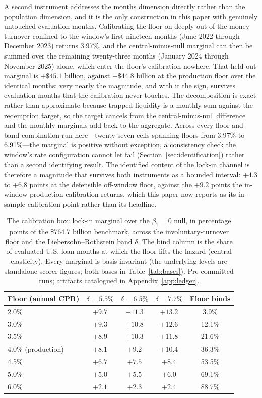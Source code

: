\documentclass[12pt]{article}
\begin{document}
A second instrument addresses the months dimension directly rather than the population dimension, and it is the only construction in this paper with genuinely untouched evaluation months. Calibrating the floor on deeply out-of-the-money turnover confined to the window's first nineteen months (June 2022 through December 2023) returns 3.97\%, and the central-minus-null marginal can then be summed over the remaining twenty-three months (January 2024 through November 2025) alone, which enter the floor's calibration nowhere. That held-out marginal is $+\$45.1$ billion, against $+\$44.8$ billion at the production floor over the identical months: very nearly the magnitude, and with it the sign, survives evaluation months that the calibration never touches. The decomposition is exact rather than approximate because trapped liquidity is a monthly sum against the redemption target, so the target cancels from the central-minus-null difference and the monthly marginals add back to the aggregate. Across every floor and band combination run here---twenty-seven cells spanning floors from 3.97\% to 6.91\%---the marginal is positive without exception, a consistency check the window's rate configuration cannot let fail (Section~\ref{sec:identification}) rather than a second identifying result. The identified content of the lock-in channel is therefore a magnitude that survives both instruments as a bounded interval: $+4.3$ to $+6.8$ points at the defensible off-window floor, against the $+9.2$ points the in-window production calibration returns, which this paper now reports as its in-sample calibration point rather than its headline.

\begin{table}[H]
\centering
\caption{The calibration box: lock-in marginal over the $\beta_1 = 0$ null, in percentage points of the \$764.7 billion benchmark, across the involuntary-turnover floor and the Liebersohn--Rothstein band $\delta$. The bind column is the share of evaluated U.S. loan-months at which the floor lifts the hazard (central elasticity). Every marginal is basis-invariant (the underlying levels are standalone-scorer figures; both bases in Table~\ref{tab:bases}). Pre-committed runs; artifacts catalogued in Appendix~\ref{app:ledger}.}
\label{tab:floorband}
\begin{tabular}{lcccc}
\toprule
Floor (annual CPR) & $\delta = 5.5\%$ & $\delta = 6.5\%$ & $\delta = 7.7\%$ & Floor binds \\
\midrule
2.0\% & $+9.7$ & $+11.3$ & $+13.2$ & 3.9\% \\
3.0\% & $+9.3$ & $+10.8$ & $+12.6$ & 12.1\% \\
3.5\% & $+8.9$ & $+10.3$ & $+11.8$ & 21.6\% \\
4.0\% (production) & $+8.1$ & $+9.2$ & $+10.4$ & 36.3\% \\
4.5\% & $+6.7$ & $+7.5$ & $+8.4$ & 53.5\% \\
5.0\% & $+5.0$ & $+5.5$ & $+6.0$ & 69.1\% \\
6.0\% & $+2.1$ & $+2.3$ & $+2.4$ & 88.7\% \\
\bottomrule
\end{tabular}
\end{table}
\end{document}
